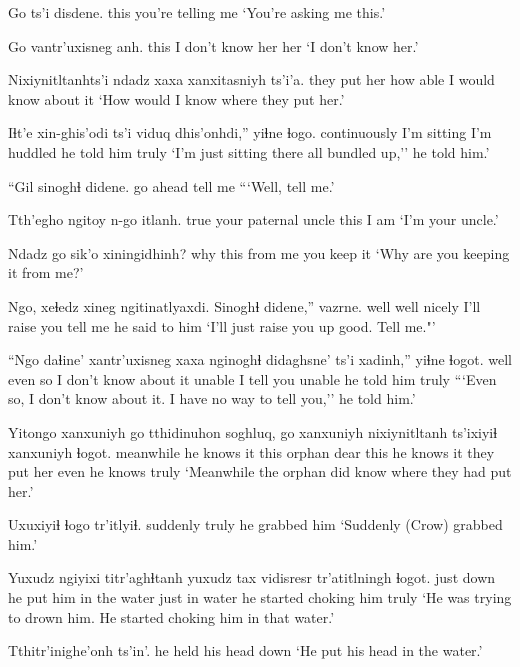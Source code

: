 \documentclass[12pt]{article}
\begin{document}
\gll Go ts'i disdene. 
this {}  {you're telling me}
\glt `You're asking me this.'
\glend

\gll Go   vantr'uxisneg    anh.
this {I don't know her} her
\glt `I don't know her.'
\glend

\gll Nixiynitltanhts'i ndadz xaxa xanxitasniyh ts'i'a. 
{they put her}    how    able     {I would know about it}
\glt `How would I know where they put her.'
\glend

\gll Iɬt'e        xin-ghis'odi ts'i {viduq dhis'onhdi,''}   yiɬne       ɬogo.
continuously {I'm sitting}     {}  {I'm huddled}   {he told him} truly
\glt `I'm just sitting there all bundled up,'' he told him.'
\glend

\gll ``Gil      {sinoghɬ didene. }
{go ahead} {tell me}
\glt ```Well, tell me.'
\glend

\gll Tth'egho ngitoy     n-go itlanh.
true     {your paternal uncle} this {I am}
\glt `I'm your uncle.'
\glend

\gll Ndadz go sik'o   xiningidhinh?
why   this {from me} {you keep it}
\glt `Why are you keeping it from me?'
\glend

\gll Ngo, xeɬedz xineg  ngitinatlyaxdi. {Sinoghɬ didene},'' vazrne.
well well   nicely {I'll raise you} {tell me}      {he said to him}
\glt `I'll just raise you up good. Tell me."'
\glend

\gll ``Ngo  daɬine' xantr'uxisneg xaxa     {nginoghɬ didaghsne'} ts'i xadinh,'' yiɬne       ɬogot.
well {even so} {I don't know about it} unable {I tell you}       {}   unable {he told him} truly
\glt ```Even so, I don't know about it. I have no way to tell you,'' he told him.'
\glend

\gll Yitongo   xanxuniyh   go   tthidinuhon soghluq, go xanxuniyh    nixiynitltanh ts'ixiyiɬ xanxuniyh ɬogot.
meanwhile {he knows it} this orphan   dear     this  {he knows it } {they put her}  even    {he knows}  truly
\glt `Meanwhile the orphan did know where they had put her.'
\glend

\gll Uxuxiyiɬ ɬogo tr'itlyiɬ.
suddenly truly {he grabbed him}
\glt `Suddenly (Crow) grabbed him.'
\glend

\gll Yuxudz ngiyixi titr'aghɬtanh           yuxudz tax          {vidisresr tr'atitlningh} ɬogot.
just   down    {he put him in the water} just   {in water} {he started choking him} truly
\glt `He was trying to drown him. He started choking him in that water.'
\glend

\gll Tthitr'inighe'onh ts'in'.
{{he held his head down}}
\glt `He put his head in the water.'
\glend
\end{document}
